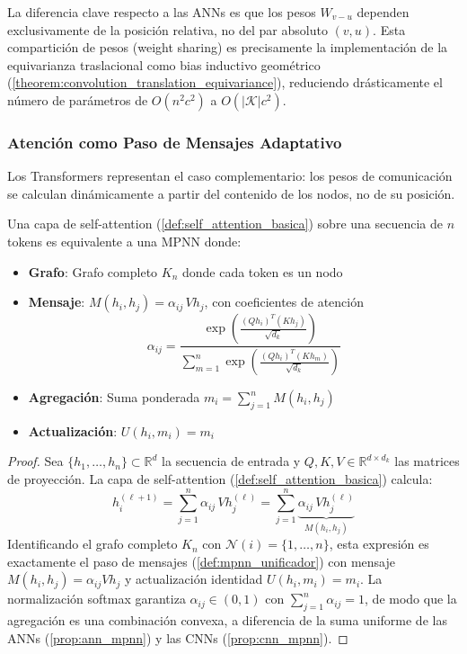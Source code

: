 La diferencia clave respecto a las \glspl{ANN} es que los pesos $W_{v-u}$ dependen exclusivamente de la posición relativa, no del par absoluto $(v, u)$. Esta compartición de pesos (weight sharing) es precisamente la implementación de la equivarianza traslacional como bias inductivo geométrico (\autoref{theorem:convolution_translation_equivariance}), reduciendo drásticamente el número de parámetros de $O(n^2 c^2)$ a $O(|\mathcal{K}| c^2)$.

\subsubsection{Atención como Paso de Mensajes Adaptativo}

Los \glspl{Transformer} representan el caso complementario: los pesos de comunicación se calculan dinámicamente a partir del contenido de los nodos, no de su posición.

\begin{proposition}\label{prop:attention_mpnn}
Una capa de self-attention (\autoref{def:self_attention_basica}) sobre una secuencia de $n$ tokens es equivalente a una \gls{MPNN} donde:
\begin{itemize}
    \item \textbf{Grafo}: Grafo completo $K_n$ donde cada token es un nodo
    \item \textbf{Mensaje}: $M(h_i, h_j) = \alpha_{ij}\, V h_j$, con coeficientes de atención
    \[
    \alpha_{ij} = \frac{\exp\!\left(\frac{(Qh_i)^T(Kh_j)}{\sqrt{d_k}}\right)}{\sum_{m=1}^n \exp\!\left(\frac{(Qh_i)^T(Kh_m)}{\sqrt{d_k}}\right)}
    \]
    \item \textbf{Agregación}: Suma ponderada $m_i = \sum_{j=1}^n M(h_i, h_j)$
    \item \textbf{Actualización}: $U(h_i, m_i) = m_i$
\end{itemize}
\end{proposition}

\begin{proof}
Sea $\{h_1, \ldots, h_n\} \subset \mathbb{R}^d$ la secuencia de entrada y $Q, K, V \in \mathbb{R}^{d \times d_k}$ las matrices de proyección. La capa de self-attention (\autoref{def:self_attention_basica}) calcula:
\[
h_i^{(\ell+1)} = \sum_{j=1}^n \alpha_{ij}\, V h_j^{(\ell)}
= \sum_{j=1}^n \underbrace{\alpha_{ij}\, V h_j^{(\ell)}}_{M(h_i, h_j)}
\]
Identificando el grafo completo $K_n$ con $\mathcal{N}(i) = \{1, \ldots, n\}$, esta expresión es exactamente el paso de mensajes (\autoref{def:mpnn_unificador}) con mensaje $M(h_i, h_j) = \alpha_{ij} V h_j$ y actualización identidad $U(h_i, m_i) = m_i$. La normalización softmax garantiza $\alpha_{ij} \in (0,1)$ con $\sum_{j=1}^n \alpha_{ij} = 1$, de modo que la agregación es una combinación convexa, a diferencia de la suma uniforme de las \glspl{ANN} (\autoref{prop:ann_mpnn}) y las \glspl{CNN} (\autoref{prop:cnn_mpnn}).
\end{proof}

